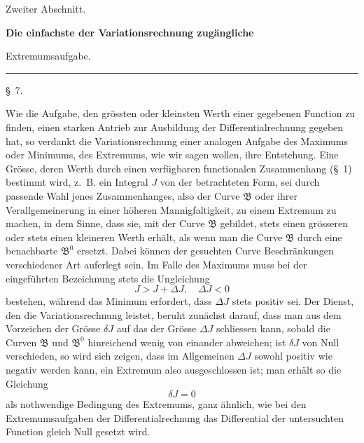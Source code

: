 \documentclass[11pt,a4paper,leqno]{article}
\begin{document}
\begin{center}
{\large Zweiter Abschnitt.}\par
\vspace{4mm}
{\Large\bfseries Die einfachste der Variationsrechnung zugängliche\par Extremumsaufgabe.}\par
\vspace{2mm}\rule{26mm}{0.4pt}\par
\end{center}

\begin{center}{\large \S~7.}\end{center}

Wie die Aufgabe, den grössten oder kleinsten Werth einer gegebenen Function zu finden, einen starken Antrieb zur Ausbildung der Differentialrechnung gegeben hat, so verdankt die Variationsrechnung einer analogen Aufgabe des Maximums oder Minimums, des Extremums, wie wir sagen wollen, ihre Entstehung. Eine Grösse, deren Werth durch einen verfügbaren functionalen Zusammenhang (\S~1) bestimmt wird, z.~B. ein Integral $J$ von der betrachteten Form, sei durch passende Wahl jenes Zusammenhanges, also der Curve $\mathfrak{B}$ oder ihrer Verallgemeinerung in einer höheren Mannigfaltigkeit, zu einem Extremum zu machen, in dem Sinne, dass sie, mit der Curve $\mathfrak{B}$ gebildet, stets einen grösseren oder stets einen kleineren Werth erhält, als wenn man die Curve $\mathfrak{B}$ durch eine benachbarte $\mathfrak{B}^0$ ersetzt. Dabei können der gesuchten Curve Beschränkungen verschiedener Art auferlegt sein. Im Falle des Maximums muss bei der eingeführten Bezeichnung stets die Ungleichung
\[
J>J+\Delta J,\quad \Delta J<0
\]
bestehen, während das Minimum erfordert, dass $\Delta J$ stets positiv sei. Der Dienst, den die Variationsrechnung leistet, beruht zunächst darauf, dass man aus dem Vorzeichen der Grösse $\delta J$ auf das der Grösse $\Delta J$ schliessen kann, sobald die Curven $\mathfrak{B}$ und $\mathfrak{B}^0$ hinreichend wenig von einander abweichen; ist $\delta J$ von Null verschieden, so wird sich zeigen, dass im Allgemeinen $\Delta J$ sowohl positiv wie negativ werden kann, ein Extremum also ausgeschlossen ist; man erhält so die Gleichung
\[
\delta J=0
\]
als nothwendige Bedingung des Extremums, ganz ähnlich, wie bei den Extremumsaufgaben der Differentialrechnung das Differential der untersuchten Function gleich Null gesetzt wird.
\end{document}
